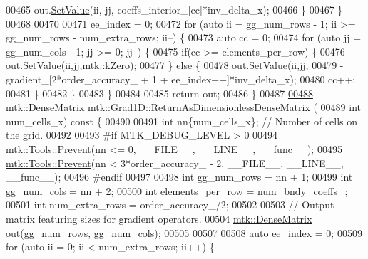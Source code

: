 \begin{DoxyCode}
{{00465       out.\hyperlink{classmtk_1_1DenseMatrix_a784ce5784109ac86bfb9d8562b334b13}{SetValue}(ii, jj, coeffs\_interior\_[cc]*inv\_delta\_x);
00466     \}
00467   \}
00468 
00470 
00471   ee\_index = 0;
00472   \textcolor{keywordflow}{for} (\textcolor{keyword}{auto} ii = gg\_num\_rows - 1; ii >= gg\_num\_rows - num\_extra\_rows; ii--) \{
00473     \textcolor{keyword}{auto} cc = 0;
00474     \textcolor{keywordflow}{for} (\textcolor{keyword}{auto} jj = gg\_num\_cols - 1; jj >= 0; jj--) \{
00475       \textcolor{keywordflow}{if}(cc >= elements\_per\_row) \{
00476         out.\hyperlink{classmtk_1_1DenseMatrix_a784ce5784109ac86bfb9d8562b334b13}{SetValue}(ii,jj,\hyperlink{group__c01-roots_ga59a451a5fae30d59649bcda274fea271}{mtk::kZero});
00477       \} \textcolor{keywordflow}{else} \{
00478         out.\hyperlink{classmtk_1_1DenseMatrix_a784ce5784109ac86bfb9d8562b334b13}{SetValue}(ii,jj,
00479                      -gradient\_[2*order\_accuracy\_ + 1 + ee\_index++]*inv\_delta\_x);
00480         cc++;
00481       \}
00482      \}
00483   \}
00484 
00485   \textcolor{keywordflow}{return} out;
00486 \}
00487 
\hypertarget{mtk__grad__1d_8cc_source_l00488}{}\hyperlink{classmtk_1_1Grad1D_ab07e6a15edca32534ae3d1a8ccaf1c42}{00488} \hyperlink{classmtk_1_1DenseMatrix}{mtk::DenseMatrix} \hyperlink{classmtk_1_1Grad1D_ab07e6a15edca32534ae3d1a8ccaf1c42}{mtk::Grad1D::ReturnAsDimensionlessDenseMatrix}
      (
00489   \textcolor{keywordtype}{int} num\_cells\_x)\textcolor{keyword}{ const }\{
00490 
00491   \textcolor{keywordtype}{int} nn\{num\_cells\_x\}; \textcolor{comment}{// Number of cells on the grid.}
00492 
00493 \textcolor{preprocessor}{  #if MTK\_DEBUG\_LEVEL > 0}
00494   \hyperlink{classmtk_1_1Tools_a332324c6f25e66be9dff48c5987a3b9f}{mtk::Tools::Prevent}(nn <= 0, \_\_FILE\_\_, \_\_LINE\_\_, \_\_func\_\_);
00495   \hyperlink{classmtk_1_1Tools_a332324c6f25e66be9dff48c5987a3b9f}{mtk::Tools::Prevent}(nn < 3*order\_accuracy\_ - 2, \_\_FILE\_\_, \_\_LINE\_\_, \_\_func\_\_);
00496 \textcolor{preprocessor}{  #endif}
00497 
00498   \textcolor{keywordtype}{int} gg\_num\_rows = nn + 1;
00499   \textcolor{keywordtype}{int} gg\_num\_cols = nn + 2;
00500   \textcolor{keywordtype}{int} elements\_per\_row = num\_bndy\_coeffs\_;
00501   \textcolor{keywordtype}{int} num\_extra\_rows = order\_accuracy\_/2;
00502 
00503   \textcolor{comment}{// Output matrix featuring sizes for gradient operators.}
00504   \hyperlink{classmtk_1_1DenseMatrix}{mtk::DenseMatrix} out(gg\_num\_rows, gg\_num\_cols);
00505 
00507 
00508   \textcolor{keyword}{auto} ee\_index = 0;
00509   \textcolor{keywordflow}{for} (\textcolor{keyword}{auto} ii = 0; ii < num\_extra\_rows; ii++) \{
}}
\end{DoxyCode}
